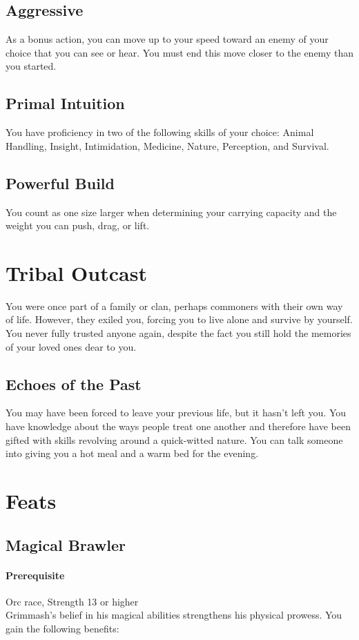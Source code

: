 \documentclass[letterpaper,openany,oneside,twocolumn]{book}
\begin{document}
\subsection*{Aggressive}
As a bonus action, you can move up to your speed toward an enemy of your choice that you can see or hear. You must end this move closer to the enemy than you started.
\subsection*{Primal Intuition}
You have proficiency in two of the following skills of your choice: Animal Handling, Insight, Intimidation, Medicine, Nature, Perception, and Survival.
\subsection*{Powerful Build}
You count as one size larger when determining your carrying capacity and the weight you can push, drag, or lift.

\section*{Tribal Outcast}
You were once part of a family or clan, perhaps commoners with their own way of life. However, they exiled you, forcing you to live alone and survive by yourself. You never fully trusted anyone again, despite the fact you still hold the memories of your loved ones dear to you.
\subsection*{Echoes of the Past}
You may have been forced to leave your previous life, but it hasn't left you. You have knowledge about the ways people treat one another and therefore have been gifted with skills revolving around a quick-witted nature. You can talk someone into giving you a hot meal and a warm bed for the evening.

\section*{Feats}
\subsection*{Magical Brawler}
\paragraph*{Prerequisite} Orc race, Strength 13 or higher\\
Grimmash's belief in his magical abilities strengthens his physical prowess. You gain the following benefits:
\end{document}
